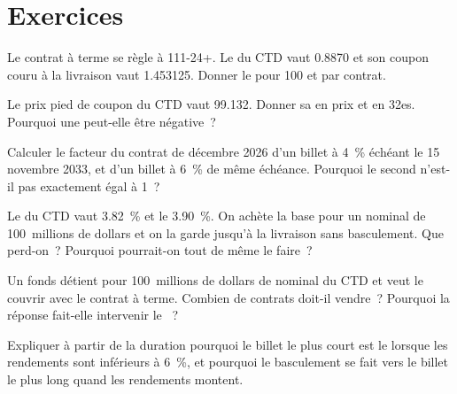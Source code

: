 \section{Exercices}

\begin{exercise}[$\star$]\label{exo:m2:bond-futures:1}
Le contrat à terme se règle à 111-24+. Le  du CTD vaut 0.8870 et son
coupon couru à la livraison vaut 1.453125. Donner le  pour 100 et par
contrat.
\end{exercise}

\begin{exercise}[$\star$]\label{exo:m2:bond-futures:2}
Le prix pied de coupon du CTD vaut 99.132. Donner sa  en prix et en 32es.
Pourquoi une  peut-elle être négative~?
\end{exercise}

\begin{exercise}[$\star$]\label{exo:m2:bond-futures:3}
Calculer le facteur du contrat de décembre 2026 d'un billet à 4~\% échéant le 15 novembre 2033, et
d'un billet à 6~\% de même échéance. Pourquoi le second n'est-il pas exactement égal à 1~?
\end{exercise}

\begin{exercise}[$\star\star$]\label{exo:m2:bond-futures:4}
Le  du CTD vaut 3.82~\% et le  3.90~\%. On achète la base
pour un nominal de 100~millions de dollars et on la garde jusqu'à la livraison sans basculement. Que perd-on~?
Pourquoi pourrait-on tout de même le faire~?
\end{exercise}

\begin{exercise}[$\star\star$]\label{exo:m2:bond-futures:5}
Un fonds détient pour 100~millions de dollars de nominal du CTD et veut le couvrir avec le
contrat à terme. Combien de contrats doit-il vendre~? Pourquoi la réponse fait-elle intervenir le
~?
\end{exercise}

\begin{exercise}[$\star\star$]\label{exo:m2:bond-futures:6}
Expliquer à partir de la duration pourquoi le billet le plus court est le  lorsque
les rendements sont inférieurs à 6~\%, et pourquoi le basculement se fait vers le billet le plus long quand les
rendements montent.
\end{exercise}


